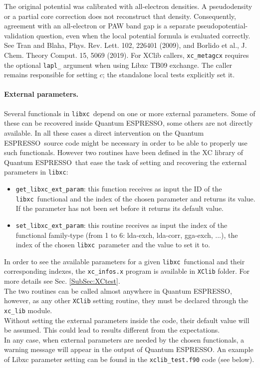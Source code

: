 \documentclass[12pt,a4paper]{article}
\def\qe{{\sc Quantum ESPRESSO}}
\def\libxc{\texttt{libxc}}
\begin{document}
The original potential was calibrated with all-electron densities. A
pseudodensity or a partial core correction does not reconstruct that density.
Consequently, agreement with an all-electron or PAW band gap is a separate
pseudopotential-validation question, even when the local potential formula
is evaluated correctly. See Tran and Blaha, Phys. Rev. Lett. 102, 226401
(2009), and Borlido et al., J. Chem. Theory Comput. 15, 5069 (2019).
For XClib callers, \texttt{xc\_metagcx} requires the optional
\texttt{lapl\_} argument when using Libxc TB09 exchange. The caller remains
responsible for setting $c$; the standalone local tests explicitly set it.

\paragraph{External parameters.}
Several functionals in \libxc\ depend on one or more external parameters. Some of these can be recovered inside \qe, some others are not directly available. In all these cases a direct intervention on the \qe\ source code might be necessary in order to be able to properly use such functionals. However two routines have been defined in the XC library of \qe\ that ease the task of setting and recovering the external parameters in \libxc:
\begin{itemize}
	\item \texttt{get\_libxc\_ext\_param}: this function receives as input the ID of the \libxc\ functional and the index of the chosen parameter and returns its value. If the parameter has not been set before it returns its default value.
	\item \texttt{set\_libxc\_ext\_param}: this routine receives as input the index of the functional family-type (from 1 to 6: lda-exch, lda-corr, gga-exch, ...), the index of the chosen \libxc\ parameter and the value to set it to.
\end{itemize}
In order to see the available parameters for a given \libxc\ functional and their corresponding indexes, the \texttt{xc\_infos.x} program is available in \texttt{XClib} folder. For more details see Sec. \ref{SubSec:XCtest}.\\
The two routines can be called almost anywhere in \qe, however, as any other \texttt{XClib} setting routine, they must be declared through the \texttt{xc\_lib} module.\\
Without setting the external parameters inside the code, their default value will be assumed. This could lead to results different from the expectations.\\
In any case, when external parameters are needed by the chosen functionals, a warning message will appear in the output of \qe. An example of Libxc parameter setting can be found in the \texttt{xclib\_test.f90} code (see below).
%
\end{document}
